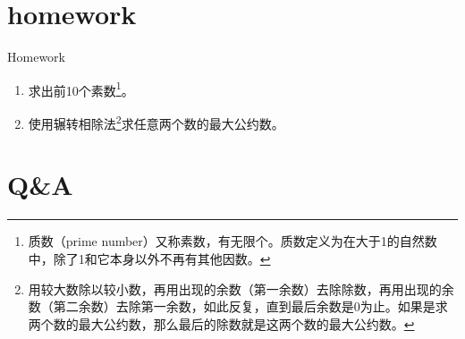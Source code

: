 \documentclass{beamer}
\begin{document}
\section{homework}
\begin{frame}{Homework}
\begin{enumerate}
\item
求出前10个素数\footnote{质数（prime number）又称素数，有无限个。质数定义为在大于1的自然数中，除了1和它本身以外不再有其他因数。}。
\item
使用辗转相除法\footnote{用较大数除以较小数，再用出现的余数（第一余数）去除除数，再用出现的余数（第二余数）去除第一余数，如此反复，直到最后余数是0为止。如果是求两个数的最大公约数，那么最后的除数就是这两个数的最大公约数。}求任意两个数的最大公约数。
\end{enumerate}
\end{frame}
\section{Q\&A}
\begin{frame}
\end{frame}


%
\end{document}
